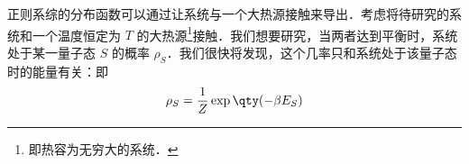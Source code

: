 
\begin{issues}
\issueDraft
\end{issues}

正则系综的分布函数可以通过让系统与一个大热源接触来导出．考虑将待研究的系统和一个温度恒定为 $T$ 的大热源\footnote{即热容为无穷大的系统．}接触．我们想要研究，当两者达到平衡时，系统处于某一量子态 $S$ 的概率 $\rho_S$．我们很快将发现，这个几率只和系统处于该量子态时的能量有关：即
\begin{equation}
\rho_S=\frac{1}{Z}\exp\qty(-\beta E_S)
\end{equation}
